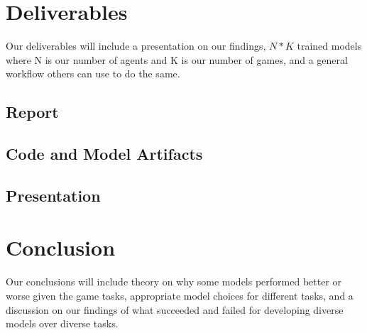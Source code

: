 \documentclass[conference]{IEEEtran}
\begin{document}
\section{Deliverables}
Our deliverables will include a presentation on our findings, $N*K$ trained models where N is our number of agents and K is our number of games, and a general workflow others can use to do the same.

\subsection{Report}

\subsection{Code and Model Artifacts}

\subsection{Presentation}

\section{Conclusion}
Our conclusions will include theory on why some models performed better or worse given the game tasks, appropriate model choices for different tasks, and a discussion on our findings of what succeeded and failed for developing diverse models over diverse tasks.

{}


\vspace{12pt}
\end{document}
